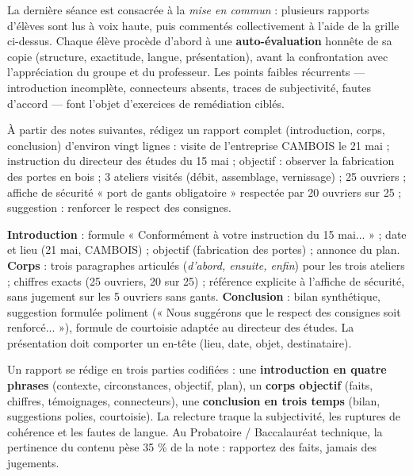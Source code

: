 \documentclass[11pt]{article}
\newcounter{popsec}
\newcounter{popsub}
\newcommand{\courssub}[1]{%
  \stepcounter{popsub}%
  \par\vspace{9pt}\noindent{\popxbold\fontsize{11.5}{13}\selectfont\color{popink}{\color{poporange}\thepopsec.\thepopsub}\hspace{6pt}#1}\par\nopagebreak\vspace{4pt}
}
\begin{document}
\courssub{Compte rendu collectif et remédiation}

La dernière séance est consacrée à la \emph{mise en commun} : plusieurs rapports d'élèves sont lus à voix haute, puis commentés collectivement à l'aide de la grille ci-dessus. Chaque élève procède d'abord à une \textbf{auto-évaluation} honnête de sa copie (structure, exactitude, langue, présentation), avant la confrontation avec l'appréciation du groupe et du professeur. Les points faibles récurrents — introduction incomplète, connecteurs absents, traces de subjectivité, fautes d'accord — font l'objet d'exercices de remédiation ciblés.

\begin{exercice}
À partir des notes suivantes, rédigez un rapport complet (introduction, corps, conclusion) d'environ vingt lignes : visite de l'entreprise CAMBOIS le 21 mai ; instruction du directeur des études du 15 mai ; objectif : observer la fabrication des portes en bois ; 3 ateliers visités (débit, assemblage, vernissage) ; 25 ouvriers ; affiche de sécurité « port de gants obligatoire » respectée par 20 ouvriers sur 25 ; suggestion : renforcer le respect des consignes.
\end{exercice}

\begin{corrige}
\textbf{Introduction} : formule « Conformément à votre instruction du 15 mai... » ; date et lieu (21 mai, CAMBOIS) ; objectif (fabrication des portes) ; annonce du plan. \textbf{Corps} : trois paragraphes articulés (\emph{d'abord, ensuite, enfin}) pour les trois ateliers ; chiffres exacts (25 ouvriers, 20 sur 25) ; référence explicite à l'affiche de sécurité, sans jugement sur les 5 ouvriers sans gants. \textbf{Conclusion} : bilan synthétique, suggestion formulée poliment (« Nous suggérons que le respect des consignes soit renforcé... »), formule de courtoisie adaptée au directeur des études. La présentation doit comporter un en-tête (lieu, date, objet, destinataire).
\end{corrige}

\begin{aretenir}
Un rapport se rédige en trois parties codifiées : une \textbf{introduction en quatre phrases} (contexte, circonstances, objectif, plan), un \textbf{corps objectif} (faits, chiffres, témoignages, connecteurs), une \textbf{conclusion en trois temps} (bilan, suggestions polies, courtoisie). La relecture traque la subjectivité, les ruptures de cohérence et les fautes de langue. Au Probatoire / Baccalauréat technique, la pertinence du contenu pèse 35 \% de la note : rapportez des faits, jamais des jugements.
\end{aretenir}
\end{document}
